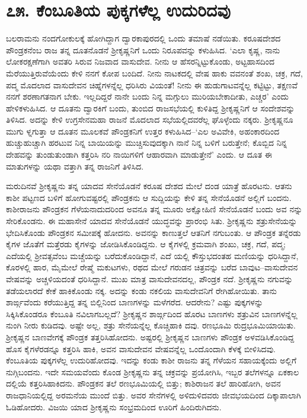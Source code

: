 
\chapter{೭೫. ಕೆಂಬೂತಿಯ ಪುಕ್ಕಗಳೆಲ್ಲ ಉದುರಿದವು}

ಬಲರಾಮನು ನಂದಗೋಕುಲಕ್ಕೆ ಹೋಗಿದ್ದಾಗ ದ್ವಾರಕಾಪುರದಲ್ಲಿ ಒಂದು ತಮಾಷೆ ನಡೆಯಿತು. ಕರೂಷದೇಶದ ಪೌಂಡ್ರಕನೆಂಬ ರಾಜ ತನ್ನ ದೂತನೊಡನೆ ಶ್ರೀಕೃಷ್ಣನಿಗೆ ಒಂದು ನಿರೂಪವನ್ನು ಕಳುಹಿಸಿದ. ‘ಎಲಾ ಕೃಷ್ಣ, ನಾನು ಲೋಕರಕ್ಷಣೆಗಾಗಿ ಅವತರಿ ಸಿರುವ ನಿಜವಾದ ವಾಸುದೇವ. ನೀನು ಆ ಹೆಸರನ್ನಿಟ್ಟುಕೊಂಡು, ಅಟ್ಟಹಾಸದಿಂದ ಮೆರೆಯುತ್ತಿರುವೆಯೆಂದು ಕೇಳಿ ನನಗೆ ಕೋಪ ಬಂದಿದೆ. ನೀನು ನಾಟಕದಲ್ಲಿ ವೇಷ ಹಾಕು ವವನಂತೆ ಶಂಖ, ಚಕ್ರ, ಗದೆ, ಪದ್ಮ ಮೊದಲಾದ ವಾಸುದೇವನ ಚಿಹ್ನೆಗಳನ್ನೆಲ್ಲ ಧರಿಸಿರು ವಿಯಂತೆ! ನೀನು ಈ ಹುಡುಗಾಟವನ್ನೆಲ್ಲ ಕಟ್ಟಿಟ್ಟು, ತಕ್ಷಣವೆ ನನಗೆ ಶರಣಾಗತನಾಗ ಬೇಕು. ಇಲ್ಲದಿದ್ದರೆ ನಾನೇ ಬಂದು ನಿನ್ನ ಮಗ್ಗುಲು ಮುರಿಯಬೇಕಾದೀತು, ಎಚ್ಚರ’ ಎಂದು ಹೇಳಿಕಳುಹಿಸಿದ. ಆ ದೂತನು ದ್ವಾರಕಿಗೆ ಬಂದು, ತುಂಬಿದ ರಾಜಸಭೆಯಲ್ಲಿ ಕುಳಿತಿದ್ದ ಶ್ರೀಕೃಷ್ಣನಿಗೆ ಆ ಸಂದೇಶವನ್ನು ತಿಳಿಸಿದ. ಅದನ್ನು ಕೇಳಿ ಉಗ್ರಸೇನಮಹಾ ರಾಜನೆ ಮೊದಲಾದ ಸಭೆಯಲ್ಲಿದವರೆಲ್ಲ ಘೊಳ್ಳೆಂದು ನಕ್ಕರು. ಶ್ರೀಕೃಷ್ಣನೂ ಮುಗು ಳ್ನಗುತ್ತಾ ಆ ದೂತನ ಮೂಲಕವೆ ಪೌಂಡ್ರಕನಿಗೆ ಉತ್ತರ ಕಳುಹಿಸಿದ–‘ಎಲ ಅವಿವೇಕಿ, ಅಹಂಕಾರದಿಂದ ಹುಚ್ಚುಹುಚ್ಚಾಗಿ ಹರಟುವ ನಿನ್ನ ಬಾಯಿಯನ್ನು ಮುಚ್ಚಿಸುವುದಕ್ಕಾಗಿ ನಾನೆ ನಿನ್ನ ಬಳಿಗೆ ಬರುತ್ತೇನೆ; ಕೊಬ್ಬಿದ ನಿನ್ನ ದೇಹವನ್ನು ತುಂಡುತುಂಡಾಗಿ ಕತ್ತರಿಸಿ ನರಿ ನಾಯಿಗಳಿಗೆ ಆಹಾರವಾಗಿ ಮಾಡುತ್ತೇನೆ’ ಎಂದು. ಆ ದೂತ ಈ ಮಾತುಗಳನ್ನು ಯಥಾ ವತ್ತಾಗಿ ತನ್ನ ರಾಜನಿಗೆ ತಿಳಿಸಿದ.

ಮರುದಿನವೆ ಶ್ರೀಕೃಷ್ಣನು ತನ್ನ ಯಾದವ ಸೇನೆಯೊಡನೆ ಕರೂಷ ದೇಶದ ಮೇಲೆ ದಂಡ ಯಾತ್ರೆ ಹೊರಟನು. ಆತನು ಕಾಶೀ ಪಟ್ಟಣದ ಬಳಿಗೆ ಹೋಗುವಷ್ಟರಲ್ಲಿ ಪೌಂಡ್ರಕನು ಆ ಸುದ್ದಿಯನ್ನು ಕೇಳಿ ತನ್ನ ಸೇನೆಯೊಡನೆ ಅಲ್ಲಿಗೆ ಬಂದನು. ಕಾಶೀರಾಜನು ಪೌಂಡ್ರಕನ ಗೆಳೆಯನಾದುದರಿಂದ ಅವನೂ ತನ್ನ ಮೂರು ಅಕ್ಷೋಹಿಣಿ ಸೇನೆಯೊಡನೆ ಬಂದು ಅವ ನನ್ನು ಸೇರಿಕೊಂಡನು. ಈ ಮಹಾಸೇನೆ ಯಾದವ ಸೇನೆಯೊಡನೆ ಯುದ್ಧವನ್ನು ಪ್ರಾರಂಭಿ ಸಿತು. ಶ್ರೀಕೃಷ್ಣನು ಶತ್ರುಸೇನೆಯನ್ನು ಭೇದಿಸಿಕೊಂಡು ಪೌಂಡ್ರಕನ ಸಮೀಪಕ್ಕೆ ಹೋದನು. ಅವನನ್ನು ಕಾಣುತ್ತಲೆ ಆತನಿಗೆ ನಗುಬಂತು. ಆ ಪೌಂಡ್ರಕ ತನ್ನೆರಡು ಕೈಗಳ ಜೊತೆಗೆ ಮತ್ತೆರಡು ಕೈಗಳನ್ನು ಜೋಡಿಸಿಕೊಂಡಿದ್ದನು. ಆ ಕೈಗಳಲ್ಲಿ ಕ್ರಮವಾಗಿ ಶಂಖು, ಚಕ್ರ, ಗದೆ, ಪದ್ಮ; ಎದೆಯಲ್ಲಿ ಶ್ರೀವತ್ಸವೆಂಬ ಮಚ್ಚೆಯನ್ನು ಬರೆದುಕೊಂಡಿದ್ದಾನೆ, ಎದೆ ಯಲ್ಲಿ ಕೌಸ್ತುಭದಂತಹ ಮಣಿಯನ್ನು ಧರಿಸಿದ್ದಾನೆ, ಕೊರಳಲ್ಲಿ ಹಾರ, ಮೈಮೇಲೆ ರೇಷ್ಮೆ ಮಕುಟಗಳು, ರಥದ ಮೇಲೆ ಗರುಡನ ಚಿತ್ರವನ್ನು ಬರೆದ ಬಾವುಟ–ವಾಸುದೇವನ ವೇಷವನ್ನು ಅಚ್ಚಳಿಯದಂತೆ ಧರಿಸಿದ್ದಾನೆ. ಮುಖ ಮಾತ್ರ ವಾಸುದೇವನದಲ್ಲ, ಪೌಂಡ್ರಕ ನದೆ. ಶ್ರೀಕೃಷ್ಣನು ನಗುವನ್ನು ತಡೆಯಲಾರದೆ ಕೇಕೆ ಹಾಕಿಕೊಂಡು ನಕ್ಕ. ಅದನ್ನು ಕಂಡು ನಕಲಿಯ ವಾಸುದೇವನಿಗೆ ರೇಗಿಹೋಯಿತು. ತಾನು ಶಾರ್ಙ್ಗವೆಂದು ಕರೆಯುತ್ತಿದ್ದ ತನ್ನ ಬಿಲ್ಲಿನಿಂದ ಬಾಣಗಳನ್ನು ಮಳೆಗರೆದ. ಆದರೇನು? ಎಷ್ಟು ಪುಕ್ಕಗಳನ್ನು ಸಿಕ್ಕಿಸಿಕೊಂಡರೂ ಕೆಂಬೂತಿ ನವಿಲಾಗಬಲ್ಲದೆ? ಶ್ರೀಕೃಷ್ಣನ ಶಾರ್ಙ್ಗದಿಂದ ಹೊರಟ ಬಾಣಗಳು ಶತ್ರುವಿನ ಬಾಣಗಳನ್ನೆಲ್ಲ ನುಂಗಿ ನೀರು ಕುಡಿದವು. ಅಷ್ಟೇ ಅಲ್ಲ, ಶತ್ರು ಸೇನೆಯನ್ನೆಲ್ಲ ಕೊಚ್ಚಿಹಾಕಿ ದವು. ರಣಭೂಮಿ ರುದ್ರಭೂಮಿಯಾಯಿತು. ಶ್ರೀಕೃಷ್ಣನ ಬಾಣವೇಗಕ್ಕೆ ಪೌಂಡ್ರಕ ತತ್ತರಿಸಿಹೋದನು. ಅಷ್ಟರಲ್ಲಿ ಶ್ರೀಕೃಷ್ಣನ ಬಾಣಗಳು ಪೌಂಡ್ರಕ ಅಳವಡಿಸಿಕೊಂಡಿದ್ದ ಹೊಸ ಕೈಗಳೆರಡನ್ನೂ ಕತ್ತರಿಸಿ ಹಾಕಿ, ಅವನ ವಾಸುದೇವನ ವೇಷವನ್ನೆಲ್ಲ ಒಂದೊಂದಾಗಿ ಕೆಳಕ್ಕೆ ಬೀಳಿಸಿದವು. ಕೆಂಬೂತಿಯ ಪುಕ್ಕಗಳೆಲ್ಲ ಉದುರಿಹೋದವು. ಇದನ್ನು ಕಂಡು ಕಾಶೀ ರಾಜನು ತನ್ನ ಗೆಳೆಯನ ಸಹಾಯಕ್ಕೆಂದು ಅಲ್ಲಿಗೆ ನುಗ್ಗಿಬಂದನು. ಇದೇ ಸಮಯವೆಂದು ಕೊಂಡ ಶ್ರೀಕೃಷ್ಣನು ತನ್ನ ಚಕ್ರವನ್ನು ಪ್ರಯೋಗಿಸಿ, ಇಬ್ಬರ ತಲೆಗಳನ್ನೂ ಏಕಕಾಲ ದಲ್ಲಿಯೆ ಕತ್ತರಿಸಿಹಾಕಿದನು. ಪೌಂಡ್ರಕನ ತಲೆ ರಣಭೂಮಿಯಲ್ಲಿ ಬಿತ್ತು; ಕಾಶಿರಾಜನ ತಲೆ ಹಾರಿಹೋಗಿ, ಅವನ ರಾಜಧಾನಿಯಲ್ಲಿದ್ದ ಅರಮನೆಯ ಮುಂದೆ ಬಿತ್ತು. ಅವರ ಸೇನೆಗಳಲ್ಲಿ ಅಳಿದುಳಿದವರು ಜೀವಭಯದಿಂದ ದಿಕ್ಕಾಪಾಲಾಗಿ ಓಡಿಹೋದರು. ವಿಜಯಿ ಯಾದ ಶ್ರೀಕೃಷ್ಣನು ಸಂಭ್ರಮದಿಂದ ಊರಿಗೆ ಹಿಂದಿರುಗಿದನು.

